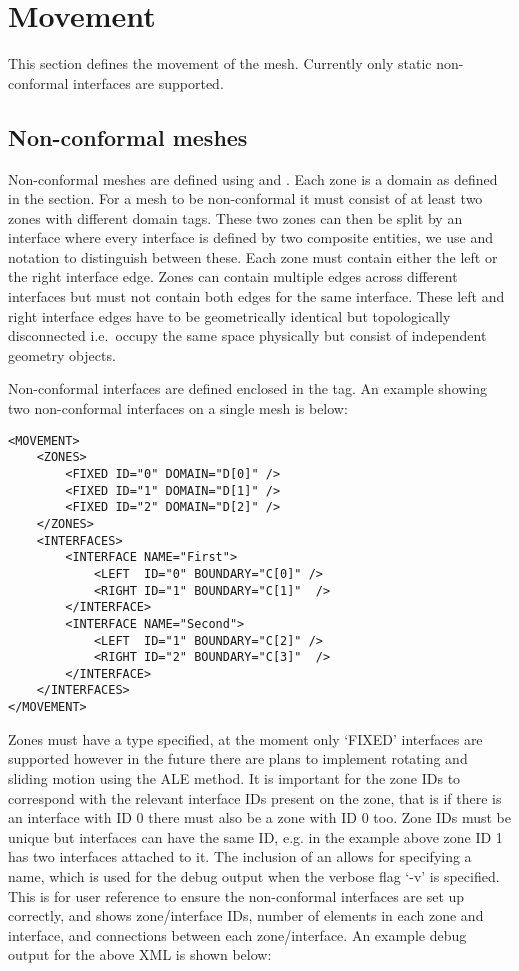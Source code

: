 \section{Movement}
This section defines the movement of the mesh. Currently only static
non-conformal interfaces are supported.

\subsection{Non-conformal meshes}\label{subsec:non-conformal-meshes}
Non-conformal meshes are defined using  and .
Each zone is a domain as defined in the  section. For a mesh to
be non-conformal it must consist of at least two zones with different domain
tags. These two zones can then be split by an interface where every interface is
defined by two composite entities, we use  and 
notation to distinguish between these. Each zone must contain either the left or
the right interface edge. Zones can contain multiple edges across different
interfaces but must not contain both edges for the same interface. These left
and right interface edges have to be geometrically identical but topologically
disconnected i.e.\ occupy the same space physically but consist of independent
geometry objects.

Non-conformal interfaces are defined enclosed in the  tag. An
example showing two non-conformal interfaces on a single mesh is below:

\begin{lstlisting}[style=XMLStyle]
<MOVEMENT>
    <ZONES>
        <FIXED ID="0" DOMAIN="D[0]" />
        <FIXED ID="1" DOMAIN="D[1]" />
        <FIXED ID="2" DOMAIN="D[2]" />
    </ZONES>
    <INTERFACES>
        <INTERFACE NAME="First">
            <LEFT  ID="0" BOUNDARY="C[0]" />
            <RIGHT ID="1" BOUNDARY="C[1]"  />
        </INTERFACE>
        <INTERFACE NAME="Second">
            <LEFT  ID="1" BOUNDARY="C[2]" />
            <RIGHT ID="2" BOUNDARY="C[3]"  />
        </INTERFACE>
    </INTERFACES>
</MOVEMENT>
\end{lstlisting}

Zones must have a type specified, at the moment only `FIXED' interfaces are
supported however in the future there are plans to implement rotating and 
sliding motion using the ALE method. It is important for the zone IDs to
correspond with the relevant interface IDs present on the zone, that is if there
is an interface with ID 0 there must also be a zone with ID 0 too. Zone IDs must
be unique but interfaces can have the same ID, e.g. in the example above zone ID
1 has two interfaces attached to it. The inclusion of an
 allows for specifying a name, which is used for
the debug output when the verbose flag `-v' is specified. This is for user
reference to ensure the non-conformal interfaces are set up correctly, and shows
zone/interface IDs, number of elements in each zone and interface, and
connections between each zone/interface. An example debug output for the above
XML is shown below:

